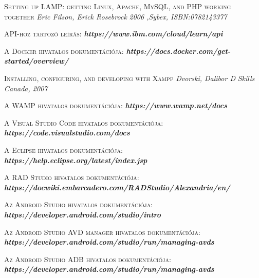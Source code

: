 \documentclass[
]{thesis-ekf}
\theoremstyle{definition}
\theoremstyle{remark}
\begin{document}
	
	\begin{thebibliography}{2}
		
		\textsc{Setting up LAMP: getting Linux, Apache, MySQL, and PHP working together}
		\newline
		\emph{Eric Filson, Erick Rosebrock}
		\emph{2006 ,Sybex, ISBN:0782143377}
		
		\textsc{API-hoz tartozó leírás:}
		\newline
		\emph{\bf{https://www.ibm.com/cloud/learn/api}}
		
		\textsc{A Docker hivatalos dokumentációja:}
		\newline
		\emph{\bf{https://docs.docker.com/get-started/overview/}}
		
		\textsc{Installing, configuring, and developing with Xampp}
		\newline
		\emph{Dvorski, Dalibor D}
		\emph{Skills Canada, 2007}
		
		\textsc{A WAMP hivatalos dokumentációja:}
		\newline
		\emph{\bf{https://www.wamp.net/docs}}
		
		\textsc{A Visual Studio Code hivatalos dokumentációja:}
		\newline
		\emph{\bf{https://code.visualstudio.com/docs}}
		
		\textsc{A Eclipse hivatalos dokumentációja:}
		\newline
		\emph{\bf{https://help.eclipse.org/latest/index.jsp}}
		
		\textsc{A RAD Studio hivatalos dokumentációja:}
		\newline
		\emph{\bf{https://docwiki.embarcadero.com/RADStudio/Alexandria/en/}}
		
		\textsc{Az Android Studio hivatalos dokumentációja:}
		\newline
		\emph{\bf{https://developer.android.com/studio/intro}}
		
		\textsc{Az Android Studio AVD manager hivatalos dokumentációja:}
		\newline
		\emph{\bf{https://developer.android.com/studio/run/managing-avds}}
		
		\textsc{Az Android Studio ADB hivatalos dokumentációja:}
		\newline
		\emph{\bf{https://developer.android.com/studio/run/managing-avds}}
		

\end{thebibliography}
\end{document}
